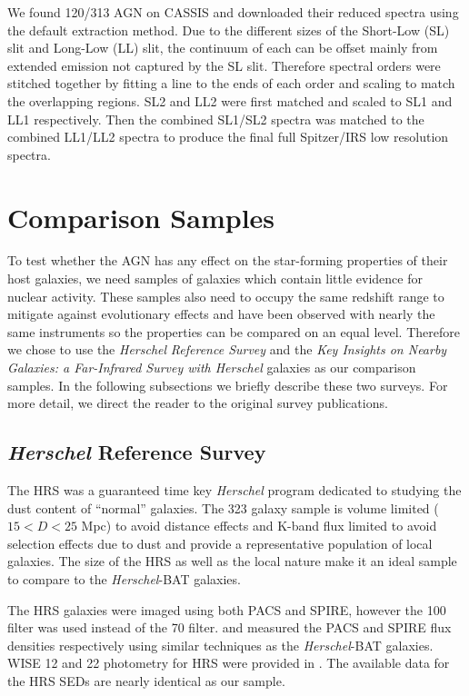 \documentclass[fleqn, usenatbib]{mnras}
\newcommand{\herschel}{\emph{Herschel}}
\begin{document}
We found 120/313 AGN on CASSIS and downloaded their reduced spectra using the default extraction method. Due to the different sizes of the Short-Low (SL) slit and Long-Low (LL) slit, the continuum of each can be offset mainly from extended emission not captured by the SL slit. Therefore spectral orders were stitched together by fitting a line to the ends of each order and scaling to match the overlapping regions. SL2 and LL2 were first matched and scaled to SL1 and LL1 respectively. Then the combined SL1/SL2 spectra was matched to the combined LL1/LL2 spectra to produce the final full Spitzer/IRS low resolution spectra. 

\section{Comparison Samples}
To test whether the AGN has any effect on the star-forming properties of their host galaxies, we need samples of galaxies which contain little evidence for nuclear activity. These samples also need to occupy the same redshift range to mitigate against evolutionary effects and have been observed with nearly the same instruments so the properties can be compared on an equal level. Therefore we chose to use the \herschel{} \textit{Reference Survey} \cite[HRS;][]{Boselli:2010fj} and the \textit{Key Insights on Nearby Galaxies: a Far-Infrared Survey with Herschel} \cite[KINGFISH;][]{Kennicutt:2011vn} galaxies as our comparison samples. In the following subsections we briefly describe these two surveys. For more detail, we direct the reader to the original survey publications.

\subsection{\herschel{} Reference Survey}
The HRS was a guaranteed time key \herschel{} program dedicated to studying the dust content of ``normal'' galaxies. The 323 galaxy sample is volume limited ($15< D < 25$ Mpc) to avoid distance effects and K-band flux limited to avoid selection effects due to dust and provide a representative population of local galaxies. The size of the HRS as well as the local nature make it an ideal sample to compare to the \herschel-BAT galaxies.

The HRS galaxies were imaged using both PACS and SPIRE, however the 100 \micron{} filter was used instead of the 70 \micron{} filter. \citet{Cortese:2014qq} and \citet{Ciesla:2012lq} measured the PACS and SPIRE flux densities respectively using similar techniques as the \herschel-BAT galaxies. WISE 12 and 22 \micron{} photometry for HRS were provided in \citet{Ciesla:2014qy}. The available data for the HRS SEDs are nearly identical as our sample. 
\end{document}
